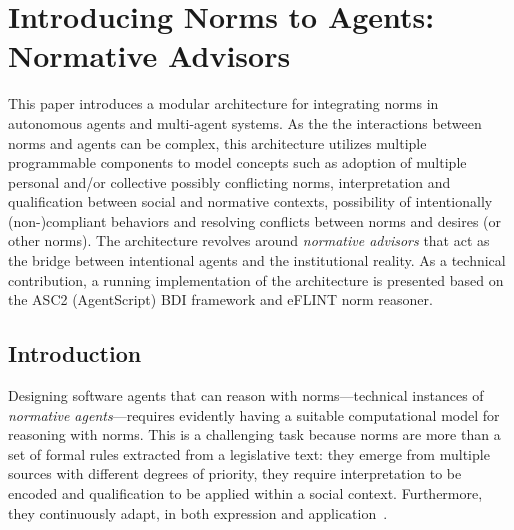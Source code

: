 \chapter{Introducing Norms to Agents: Normative Advisors}
\label{ch:normative_advisors}
This paper introduces a modular architecture for integrating norms in autonomous agents and multi-agent systems. As the the interactions between norms and agents can be complex, this architecture utilizes multiple programmable components to model concepts such as adoption of multiple personal and/or collective possibly conflicting norms, interpretation and qualification between social and normative contexts, possibility of intentionally (non-)compliant behaviors and resolving conflicts between norms and desires (or other norms). The architecture revolves around \emph{normative advisors} that act as the bridge between intentional agents and the institutional reality. As a technical contribution, a running implementation of the architecture is presented based on the ASC2 (AgentScript) BDI framework and eFLINT norm reasoner. 


\section{Introduction}
Designing software agents that can reason with norms---technical instances of \emph{normative agents}---requires evidently having a suitable computational model for reasoning with norms. This is a challenging task because norms are more than a set of formal rules extracted from a legislative text: they emerge from multiple sources with different degrees of priority, they require interpretation to be encoded and qualification to be applied within a social context. Furthermore, they continuously adapt, in both expression and application~\cite{Boella2014APractice}. 


